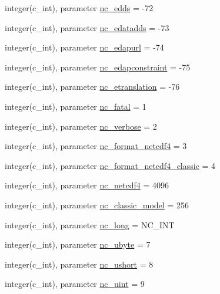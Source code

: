 \begin{DoxyCompactItemize}
\item 
integer(c\+\_\+int), parameter \hyperlink{namespacenetcdf__nc__data_a6cfc318dec516ce1e69d192810250b9b}{nc\+\_\+edds} = -\/72
\item 
integer(c\+\_\+int), parameter \hyperlink{namespacenetcdf__nc__data_ae8a1b8ebc79e1affd93b1ab2c1e837e5}{nc\+\_\+edatadds} = -\/73
\item 
integer(c\+\_\+int), parameter \hyperlink{namespacenetcdf__nc__data_a01d48838e19e0e70af483d025747f856}{nc\+\_\+edapurl} = -\/74
\item 
integer(c\+\_\+int), parameter \hyperlink{namespacenetcdf__nc__data_a5212aeb82d300b7974084d5fb0e5b189}{nc\+\_\+edapconstraint} = -\/75
\item 
integer(c\+\_\+int), parameter \hyperlink{namespacenetcdf__nc__data_a9dbf3b245bc3502ef973dd551acd3183}{nc\+\_\+etranslation} = -\/76
\item 
integer(c\+\_\+int), parameter \hyperlink{namespacenetcdf__nc__data_a218cdb0e85d508c9e7192433266f7840}{nc\+\_\+fatal} = 1
\item 
integer(c\+\_\+int), parameter \hyperlink{namespacenetcdf__nc__data_aade8a9185fed3dc8b83a2d53cf737cd2}{nc\+\_\+verbose} = 2
\item 
integer(c\+\_\+int), parameter \hyperlink{namespacenetcdf__nc__data_a6e6fb575674b407ce4bcbd8a3fbfaafb}{nc\+\_\+format\+\_\+netcdf4} = 3
\item 
integer(c\+\_\+int), parameter \hyperlink{namespacenetcdf__nc__data_a60373f746d74c3f38dea911721c5f595}{nc\+\_\+format\+\_\+netcdf4\+\_\+classic} = 4
\item 
integer(c\+\_\+int), parameter \hyperlink{namespacenetcdf__nc__data_a4c1ef05022dd5f1fcafdc0e9b792c41f}{nc\+\_\+netcdf4} = 4096
\item 
integer(c\+\_\+int), parameter \hyperlink{namespacenetcdf__nc__data_ad4978ab1f7dd98f92d2309a693d05c9b}{nc\+\_\+classic\+\_\+model} = 256
\item 
integer(c\+\_\+int), parameter \hyperlink{namespacenetcdf__nc__data_ac468d6357db55a39f2d9073faf2e48bd}{nc\+\_\+long} = N\+C\+\_\+\+I\+NT
\item 
integer(c\+\_\+int), parameter \hyperlink{namespacenetcdf__nc__data_a25ec71612dbd26d484a4974fe4f17ed0}{nc\+\_\+ubyte} = 7
\item 
integer(c\+\_\+int), parameter \hyperlink{namespacenetcdf__nc__data_a78be4744628e5b0e6599cb681fa4c050}{nc\+\_\+ushort} = 8
\item 
integer(c\+\_\+int), parameter \hyperlink{namespacenetcdf__nc__data_a465430efec40241fb49becd7ac8b5822}{nc\+\_\+uint} = 9

\end{DoxyCompactItemize}

